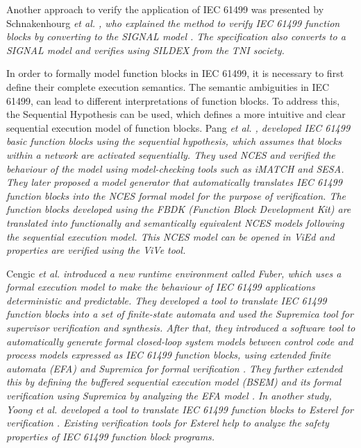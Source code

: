 \documentclass[runningheads]{llncs}
\newcommand{\etal}{\it et al. \normalfont}
\begin{document}
Another approach to verify the application of IEC 61499 was presented by Schnakenhourg \etal, who explained the method to verify IEC 61499 function blocks by converting to the SIGNAL model \cite{schnakenbourg2002towards}. The specification also converts to a SIGNAL model and verifies using SILDEX from the TNI society.

In order to formally model function blocks in IEC 61499, it is necessary to first define their complete execution semantics. The semantic ambiguities in IEC 61499, can lead to different interpretations of function blocks. To address this, the Sequential Hypothesis can be used, which defines a more intuitive and clear sequential execution model of function blocks. Pang \etal \cite{pang2007towards},  developed IEC 61499 basic function  blocks using the sequential hypothesis, which assumes that blocks within a network are activated sequentially. They used NCES and verified the behaviour of the model using model-checking tools such as iMATCH and SESA. They later proposed a model generator \cite{pang2008automatic} that automatically translates IEC 61499 function blocks into the NCES formal model for the purpose of verification. The function blocks developed using the FBDK (Function Block Development Kit) are translated into functionally and semantically equivalent NCES models following the sequential execution model. This NCES model can be opened in ViEd and properties are verified using the ViVe tool.


Cengic \etal \cite{cengic2006formal} introduced a new runtime environment called Fuber, which uses a formal execution model to make the behaviour of IEC 61499 applications deterministic and predictable. They developed a tool to translate IEC 61499 function blocks into a set of finite-state automata and used the Supremica tool for supervisor verification and synthesis. After that, they  introduced a software tool to automatically generate formal closed-loop system models between control code and process models expressed as IEC 61499 function blocks, using extended finite automata (EFA) and Supremica for formal verification \cite{vcengic2008control}. They further extended this by defining the buffered sequential execution model (BSEM) and its formal verification using Supremica by analyzing the EFA model \cite{cengic2008definition}. In another study, Yoong \etal developed a tool to translate IEC 61499 function blocks to Esterel for verification \cite{yoong2010verifying}.  Existing verification tools for Esterel help to analyze the safety properties of IEC 61499 function block programs.
\end{document}
